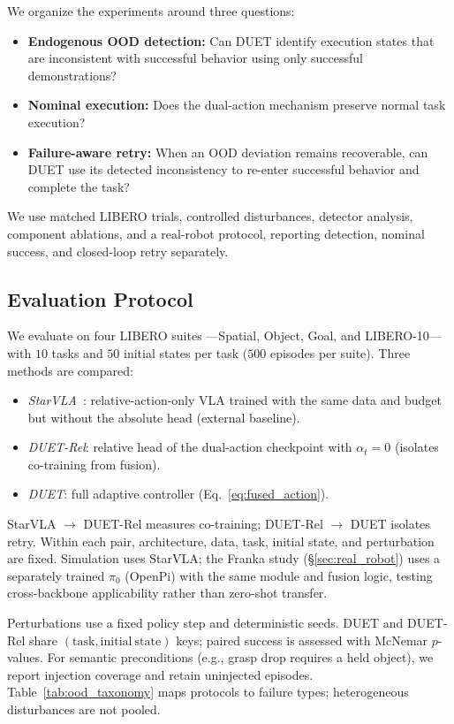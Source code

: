 \documentclass[letterpaper, 10 pt, conference]{ieeeconf}
\begin{document}
We organize the experiments around three questions:
\begin{itemize}
    \item[\textbf{(Q1)}] \textbf{Endogenous OOD detection:} Can DUET identify execution states that are inconsistent with successful behavior using only successful demonstrations?
    \item[\textbf{(Q2)}] \textbf{Nominal execution:} Does the dual-action mechanism preserve normal task execution?
    \item[\textbf{(Q3)}] \textbf{Failure-aware retry:} When an OOD deviation remains recoverable, can DUET use its detected inconsistency to re-enter successful behavior and complete the task?
\end{itemize}
We use matched LIBERO trials, controlled disturbances, detector analysis, component ablations, and a real-robot protocol, reporting detection, nominal success, and closed-loop retry separately.

\subsection{Evaluation Protocol}
We evaluate on four LIBERO suites \cite{libero}---Spatial, Object, Goal, and LIBERO-10---with $10$ tasks and $50$ initial states per task ($500$ episodes per suite). Three methods are compared:
\begin{itemize}
    \item \emph{StarVLA}~\cite{starvla}: relative-action-only VLA trained with the same data and budget but without the absolute head (external baseline).
    \item \emph{DUET-Rel}: relative head of the dual-action checkpoint with $\alpha_t{=}0$ (isolates co-training from fusion).
    \item \emph{DUET}: full adaptive controller (Eq.~\eqref{eq:fused_action}).
\end{itemize}
StarVLA $\to$ DUET-Rel measures co-training; DUET-Rel $\to$ DUET isolates retry. Within each pair, architecture, data, task, initial state, and perturbation are fixed. Simulation uses StarVLA; the Franka study (\S\ref{sec:real_robot}) uses a separately trained $\pi_0$ (OpenPi) \cite{pi0} with the same module and fusion logic, testing cross-backbone applicability rather than zero-shot transfer.

Perturbations use a fixed policy step and deterministic seeds. DUET and DUET-Rel share $(\mathrm{task},\mathrm{initial\ state})$ keys; paired success is assessed with McNemar $p$-values. For semantic preconditions (e.g., grasp drop requires a held object), we report injection coverage and retain uninjected episodes. Table~\ref{tab:ood_taxonomy} maps protocols to failure types; heterogeneous disturbances are not pooled.
\end{document}
